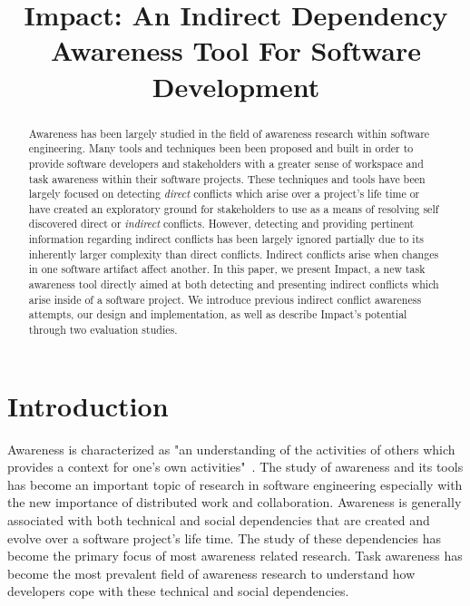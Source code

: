 \documentclass[conference]{IEEEtran}
\begin{document}
\title{Impact: An Indirect Dependency Awareness Tool For Software Development}

\author{
\and
{}
}

\maketitle

\begin{abstract}
Awareness has been largely studied in the field of awareness research within
software engineering. Many tools and techniques been been proposed and built
in order to provide software developers and stakeholders with a greater
sense of workspace and task awareness within their software projects. These
techniques and tools have been largely focused on detecting \textit{direct} 
conflicts which arise over a project's life time or have created 
an exploratory ground for stakeholders to use as a means of resolving self
discovered direct or \textit{indirect} conflicts. However, detecting 
and providing pertinent information regarding indirect conflicts has been
largely ignored partially due to its inherently larger
complexity than direct conflicts. Indirect conflicts arise when changes
in one software artifact affect another. In this paper, we present
Impact, a new task awareness tool directly aimed at both detecting
and presenting indirect conflicts which arise inside of a software project.
We introduce previous indirect conflict awareness attempts, our design 
and implementation, as well as describe Impact's potential through
two evaluation studies. 
\end{abstract}


\section{Introduction}
Awareness is characterized as "an understanding of the activities of others
which provides a context for one's own activities"~\cite{Dourish:1992:ACS}.
The study of awareness and its tools has become an important topic of
research in software engineering especially with the new importance of
distributed work and collaboration. Awareness is generally associated with
both technical and social dependencies that are created and evolve over
a software project's life time. The study of these dependencies has become
the primary focus of most awareness related research. Task awareness has
become the most prevalent field of awareness research to understand 
how developers cope with these technical and social dependencies.\\
\end{document}

